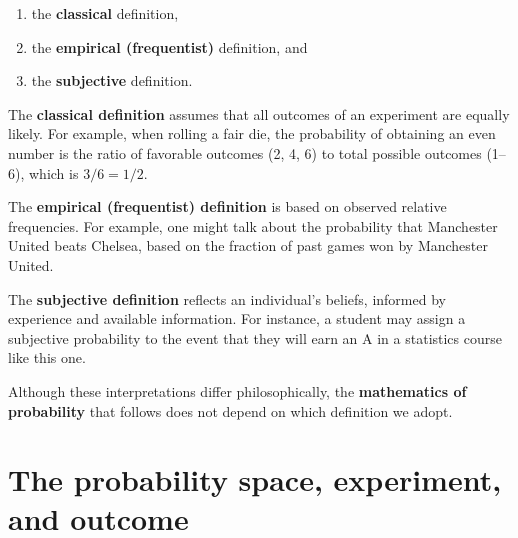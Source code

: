\documentclass[
  letterpaper,
  DIV=11,
  numbers=noendperiod]{scrreprt}
\providecommand{\tightlist}{%
  \setlength{\itemsep}{0pt}\setlength{\parskip}{0pt}}
\begin{document}
\begin{enumerate}
\def\labelenumi{\arabic{enumi}.}
\tightlist
\item
  the \textbf{classical} definition,\\
\item
  the \textbf{empirical (frequentist)} definition, and\\
\item
  the \textbf{subjective} definition.
\end{enumerate}

The \textbf{classical definition} assumes that all outcomes of an
experiment are equally likely. For example, when rolling a fair die, the
probability of obtaining an even number is the ratio of favorable
outcomes (2, 4, 6) to total possible outcomes (1--6), which is
\(3/6 = 1/2\).

The \textbf{empirical (frequentist) definition} is based on observed
relative frequencies. For example, one might talk about the probability
that Manchester United beats Chelsea, based on the fraction of past
games won by Manchester United.

The \textbf{subjective definition} reflects an individual's beliefs,
informed by experience and available information. For instance, a
student may assign a subjective probability to the event that they will
earn an A in a statistics course like this one.

\begin{tcolorbox}[enhanced jigsaw, coltitle=black, colbacktitle=quarto-callout-note-color!10!white, left=2mm, bottomrule=.15mm, bottomtitle=1mm, colback=white, titlerule=0mm, colframe=quarto-callout-note-color-frame, breakable, leftrule=.75mm, toptitle=1mm, opacitybacktitle=0.6, rightrule=.15mm, title=\textcolor{quarto-callout-note-color}{\faInfo}\hspace{0.5em}{A unifying point}, arc=.35mm, opacityback=0, toprule=.15mm]

Although these interpretations differ philosophically, the
\textbf{mathematics of probability} that follows does not depend on
which definition we adopt.

\end{tcolorbox}

\section{The probability space, experiment, and
outcome}\label{the-probability-space-experiment-and-outcome}
\end{document}
